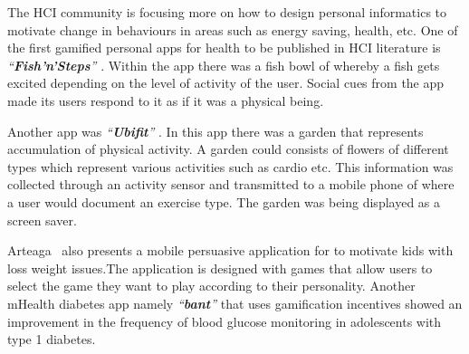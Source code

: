\documentclass{sig-alternate}
\begin{document}
The HCI community is focusing more on  how to design personal informatics to motivate change in behaviours in areas such as energy saving, health, etc. One of the first gamified personal apps for health to be published in HCI literature is \emph{``\textbf{Fish'n'Steps}''} \cite{lin2006:fish}. Within the app there  was a fish bowl of whereby a fish gets excited depending on the level of activity of the user. Social cues from the app made its users respond to it as if it was a physical being.

Another app was \emph{``\textbf{Ubifit}''} \cite{klasnja2009:using}. In this app there was a garden that represents accumulation of physical activity. A garden could consists of flowers of different types which represent various activities such as cardio etc. This information was collected through an activity sensor and transmitted to a mobile phone of where a user would document an exercise type. The garden was being displayed as a screen saver.

Arteaga~\cite{arteaga2010:persuasive} also presents a mobile persuasive application for to motivate kids with loss weight issues.The application is designed with games that allow users to select the game they want to play according to their personality. Another mHealth diabetes app namely \emph{``\textbf{bant}''} that uses gamification incentives showed an improvement in the frequency of blood glucose monitoring in adolescents with type 1 diabetes.
\end{document}
